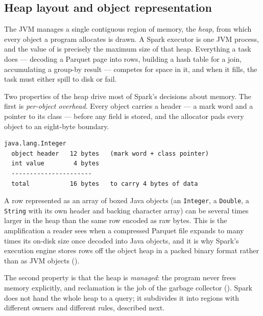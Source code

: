 
\subsection{Heap layout and object representation}
\label{sec:prereq-heap}

The JVM manages a single contiguous region of memory, the \emph{heap}, from which
every object a program allocates is drawn. A Spark executor is one JVM process,
and the value of  is precisely the maximum size of
that heap. Everything a task does --- decoding a Parquet page into rows, building
a hash table for a join, accumulating a group-by result --- competes for space in
it, and when it fills, the task must either spill to disk or fail.

Two properties of the heap drive most of Spark's decisions about memory. The
first is \emph{per-object overhead}. Every object carries a header --- a mark word
and a pointer to its class --- before any field is stored, and the allocator pads
every object to an eight-byte boundary.

\begin{lstlisting}[numbers=none,caption={Cost of a boxed integer on a 64-bit JVM},captionpos=b]
java.lang.Integer
  object header   12 bytes   (mark word + class pointer)
  int value        4 bytes
  ----------------------
  total           16 bytes   to carry 4 bytes of data
\end{lstlisting}

\noindent A row represented as an array of boxed Java objects (an
\texttt{Integer}, a \texttt{Double}, a \texttt{String} with its own header and
backing character array) can be several times larger in the heap than the same
row encoded as raw bytes. This is the amplification a reader sees when a
compressed Parquet file expands to many times its on-disk size once decoded into
Java objects, and it is why Spark's execution engine stores rows off the object
heap in a packed binary format rather than as JVM objects
().

The second property is that the heap is \emph{managed}: the program never frees
memory explicitly, and reclamation is the job of the garbage collector
(). Spark does not hand the whole heap to a query; it
subdivides it into regions with different owners and different rules, described
next.

